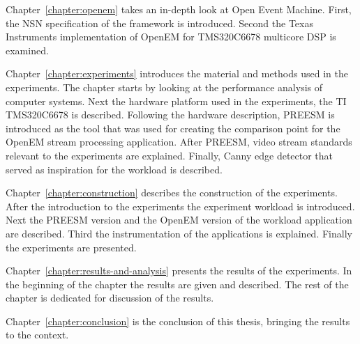Chapter~\ref{chapter:openem} takes an in-depth look at Open Event Machine. First, the NSN specification of the framework is introduced. Second the Texas Instruments implementation of OpenEM for TMS320C6678 multicore DSP is examined.

Chapter~\ref{chapter:experiments} introduces the material and methods used in the experiments. The chapter starts by looking at the performance analysis of computer systems. Next the hardware platform used in the experiments, the TI TMS320C6678 is described. Following the hardware description, PREESM is introduced as the tool that was used for creating the comparison point for the OpenEM stream processing application. After PREESM, video stream standards relevant to the experiments are explained. Finally, Canny edge detector that served as inspiration for the workload is described.

Chapter~\ref{chapter:construction} describes the construction of the experiments. After the introduction to the experiments the experiment workload is introduced. Next the PREESM version and the OpenEM version of the workload application are described. Third the instrumentation of the applications is explained. Finally the experiments are presented.

Chapter~\ref{chapter:results-and-analysis} presents the results of the experiments. In the beginning of the chapter the results are given and described. The rest of the chapter is dedicated for discussion of the results.

Chapter~\ref{chapter:conclusion} is the conclusion of this thesis, bringing the results to the context.
